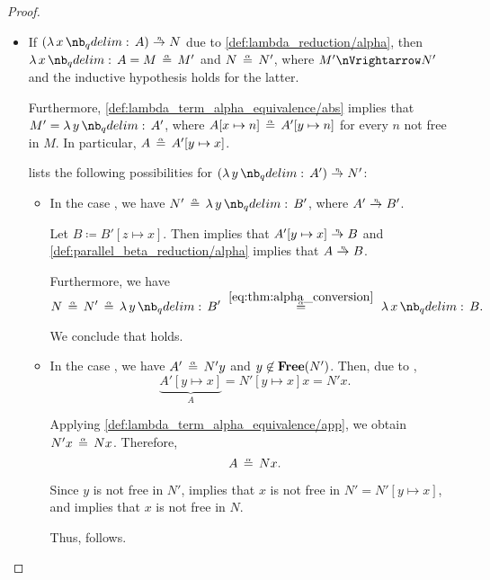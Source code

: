 \begin{proof}
\begin{itemize}
    \item If \( (\qabs x A) \ered N \) due to \ref{def:lambda_reduction/alpha}, then \( \qabs x A = M \aequiv M' \) and \( N \aequiv N' \), where \( M' \pred N' \) and the inductive hypothesis holds for the latter.

    Furthermore, \ref{def:lambda_term_alpha_equivalence/abs} implies that \( M' = \qabs y A' \), where \( A[x \mapsto n] \aequiv A'[y \mapsto n] \) for every \( n \) not free in \( M \). In particular, \( A \aequiv A'[y \mapsto x] \).

     lists the following possibilities for \( (\qabs y A') \ered N' \):
    \begin{itemize}
      \item In the case , we have \( N' \aequiv \qabs y B' \), where \( A' \ered B' \).

      Let \( B \coloneqq B'[z \mapsto x] \). Then  implies that \( A'[y \mapsto x] \ered B \) and \ref{def:parallel_beta_reduction/alpha} implies that \( A \ered B \).

      Furthermore, we have
      \begin{equation*}
        N
        \aequiv
        N'
        \aequiv
        \qabs y B'
        \reloset {\eqref{eq:thm:alpha_conversion}} \aequiv
        \qabs x B.
      \end{equation*}

      We conclude that  holds.

      \item In the case , we have \( A' \aequiv N'y \) and \( y \not\in \op*{Free}(N') \). Then, due to ,
      \begin{equation*}
        \underbrace{A'[y \mapsto x]}_A
        =
        N'[y \mapsto x] x
        =
        N' x.
      \end{equation*}

      Applying \ref{def:lambda_term_alpha_equivalence/app}, we obtain \( N' x \aequiv N x \). Therefore,
      \begin{equation*}
        A \aequiv Nx.
      \end{equation*}

      Since \( y \) is not free in \( N' \),  implies that \( x \) is not free in \( N' = N'[y \mapsto x] \), and  implies that \( x \) is not free in \( N \).

      Thus,  follows.
    \end{itemize}
  \end{itemize}
\end{proof}


